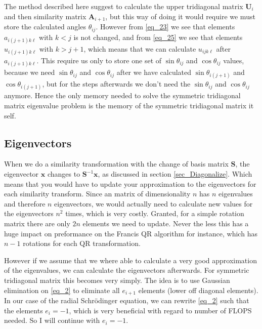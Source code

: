 \documentclass[11pt,english,a4paper]{article}
\begin{document}
\begin{flushleft}
The method described here suggest to calculate the upper tridiagonal matrix $\textbf{U}_i$ and then similarity matrix $\textbf{A}_{i+1}$, but this way of doing it would require we must store the calculated angles $\theta_{ij}$. However from \eqref{eq_23} we see  that elements $a_{i(j+1)k\ell}$ with $k < j$ is not changed, and from \eqref{eq_25} we see that elements $u_{i(j+1)k\ell}$ with $k >j+1$, which means that we can calculate $u_{ijk\ell}$ after $a_{i(j+1)k\ell}$. This require us only to store one set of $\sin\theta_{ij}$ and $\cos\theta_{ij}$ values, because we need $\sin\theta_{ij}$ and $\cos\theta_{ij}$ after we have calculated $\sin\theta_{i(j+1)}$ and $\cos\theta_{i(j+1)}$, but for the steps afterwards we don't need the $\sin\theta_{ij}$ and $\cos\theta_{ij}$ anymore. Hence the only memory needed to solve the symmetric tridiagonal matrix eigenvalue problem is the memory of the symmetric tridiagonal matrix it self.

\subsection{Eigenvectors}\label{sec_Eigenvectors}

When we do a similarity transformation with the change of basis matrix $\textbf{S}$, the eigenvector $\textbf{x}$ changes to $\textbf{S}^{-1}\textbf{x}$, as discussed in section \ref{sec_Diagonalize}. Which means that you would have to update your approximation to the eigenvectors for each similarity transform. Since an matrix of dimensionality $n$ has $n$ eigenvalues and therefore $n$ eigenvectors, we would actually need to calculate new values for the eigenvectors $n^2$ times, which is very costly. Granted, for a simple rotation matrix there are only $2n$ elements we need to update. Never the less this has a huge impact on preformance on the Francis QR algorithm for instance, which has $n-1$ rotations for each QR transformation. \linebreak

However if we assume that we where able to calculate a very good approximation of the eigenvalues, we can calculate the eigenvectors afterwards. For symmetric tridiagonal matrix this becomes very simply. The idea is to use Gaussian elimination on \eqref{eq_2}  to eliminate all $e_{i+1}$ elements (lower off diagonal elements). In our case of the radial Schr\"{o}dinger equation, we can rewrite \eqref{eq_2} such that the elements $e_i = -1$, which is very beneficial with regard to number of FLOPS needed. So I will continue with $e_i=-1$.\linebreak


\end{flushleft}
\end{document}
